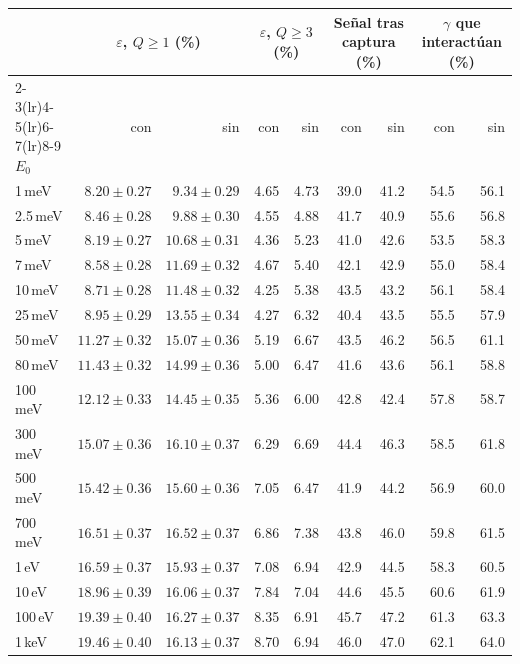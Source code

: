 \begin{tabular}{lrrrrrrrr}
\toprule
& \multicolumn{2}{c}{$\varepsilon$, $Q\geq1$ (\%)} & \multicolumn{2}{c}{$\varepsilon$, $Q\geq3$ (\%)} & \multicolumn{2}{c}{Señal tras captura (\%)} & \multicolumn{2}{c}{$\gamma$ que interactúan (\%)} \\
\cmidrule(lr){2-3}\cmidrule(lr){4-5}\cmidrule(lr){6-7}\cmidrule(lr){8-9}
$E_0$ & con & sin & con & sin & con & sin & con & sin \\
\midrule
1\,meV & $8.20\pm0.27$ & $9.34\pm0.29$ & 4.65 & 4.73 & 39.0 & 41.2 & 54.5 & 56.1 \\
2.5\,meV & $8.46\pm0.28$ & $9.88\pm0.30$ & 4.55 & 4.88 & 41.7 & 40.9 & 55.6 & 56.8 \\
5\,meV & $8.19\pm0.27$ & $10.68\pm0.31$ & 4.36 & 5.23 & 41.0 & 42.6 & 53.5 & 58.3 \\
7\,meV & $8.58\pm0.28$ & $11.69\pm0.32$ & 4.67 & 5.40 & 42.1 & 42.9 & 55.0 & 58.4 \\
10\,meV & $8.71\pm0.28$ & $11.48\pm0.32$ & 4.25 & 5.38 & 43.5 & 43.2 & 56.1 & 58.4 \\
25\,meV & $8.95\pm0.29$ & $13.55\pm0.34$ & 4.27 & 6.32 & 40.4 & 43.5 & 55.5 & 57.9 \\
50\,meV & $11.27\pm0.32$ & $15.07\pm0.36$ & 5.19 & 6.67 & 43.5 & 46.2 & 56.5 & 61.1 \\
80\,meV & $11.43\pm0.32$ & $14.99\pm0.36$ & 5.00 & 6.47 & 41.6 & 43.6 & 56.1 & 58.8 \\
100\,meV & $12.12\pm0.33$ & $14.45\pm0.35$ & 5.36 & 6.00 & 42.8 & 42.4 & 57.8 & 58.7 \\
300\,meV & $15.07\pm0.36$ & $16.10\pm0.37$ & 6.29 & 6.69 & 44.4 & 46.3 & 58.5 & 61.8 \\
500\,meV & $15.42\pm0.36$ & $15.60\pm0.36$ & 7.05 & 6.47 & 41.9 & 44.2 & 56.9 & 60.0 \\
700\,meV & $16.51\pm0.37$ & $16.52\pm0.37$ & 6.86 & 7.38 & 43.8 & 46.0 & 59.8 & 61.5 \\
1\,eV & $16.59\pm0.37$ & $15.93\pm0.37$ & 7.08 & 6.94 & 42.9 & 44.5 & 58.3 & 60.5 \\
10\,eV & $18.96\pm0.39$ & $16.06\pm0.37$ & 7.84 & 7.04 & 44.6 & 45.5 & 60.6 & 61.9 \\
100\,eV & $19.39\pm0.40$ & $16.27\pm0.37$ & 8.35 & 6.91 & 45.7 & 47.2 & 61.3 & 63.3 \\
1\,keV & $19.46\pm0.40$ & $16.13\pm0.37$ & 8.70 & 6.94 & 46.0 & 47.0 & 62.1 & 64.0 \\
\bottomrule
\end{tabular}
